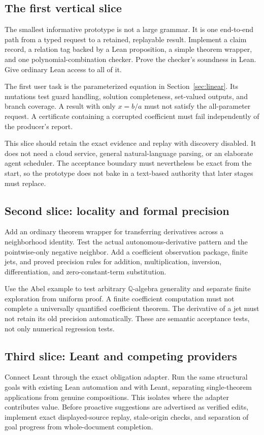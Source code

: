 \documentclass[11pt,letterpaper]{article}
\newcommand{\Q}{\mathbb Q}
\theoremstyle{definition}
\begin{document}
\subsection{The first vertical slice}
The smallest informative prototype is not a large grammar. It is one end-to-end
path from a typed request to a retained, replayable result. Implement a claim record,
a relation tag backed by a Lean proposition, a simple theorem wrapper, and one
polynomial-combination checker. Prove the checker's soundness in Lean. Give ordinary
Lean access to all of it.

The first user task is the parameterized equation in Section~\ref{sec:linear}.
Its mutations test guard handling, solution completeness, set-valued outputs,
and branch coverage. A result with only \(x=b/a\) must not satisfy the all-parameter
request. A certificate containing a corrupted coefficient must fail independently
of the producer's report.

This slice should retain the exact evidence and replay with discovery disabled.
It does not need a cloud service, general natural-language parsing, or an elaborate
agent scheduler. The acceptance boundary must nevertheless be exact from the
start, so the prototype does not bake in a text-based authority that later stages
must replace.

\subsection{Second slice: locality and formal precision}
Add an ordinary theorem wrapper for transferring derivatives across a neighborhood
identity. Test the actual autonomous-derivative pattern and the pointwise-only
negative neighbor. Add a coefficient observation package, finite jets, and proved
precision rules for addition, multiplication, inversion, differentiation, and
zero-constant-term substitution.

Use the Abel example to test arbitrary \(\Q\)-algebra generality and separate finite
exploration from uniform proof. A finite coefficient computation must not complete
a universally quantified coefficient theorem. The derivative of a jet must not
retain its old precision automatically. These are semantic acceptance tests, not
only numerical regression tests.

\subsection{Third slice: Leant and competing providers}
Connect Leant through the exact obligation adapter. Run the same structural goals
with existing Lean automation and with Leant, separating single-theorem applications
from genuine compositions. This isolates where the adapter contributes value.
Before proactive suggestions are advertised as verified edits, implement exact
displayed-source replay, stale-origin checks, and separation of goal progress from
whole-document completion.
\end{document}

